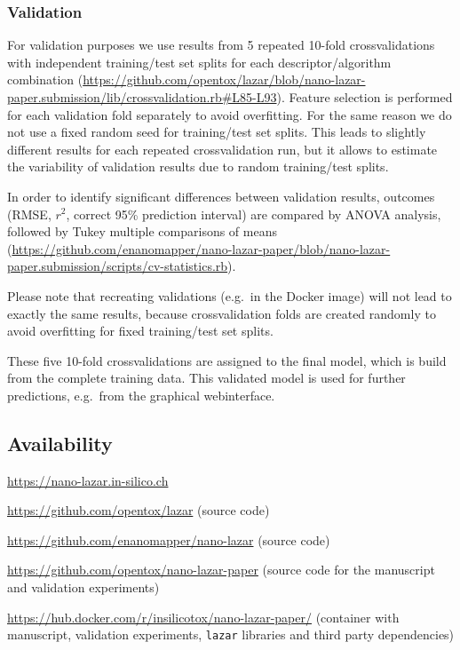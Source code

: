 \documentclass[utf8]{frontiersHLTH} %
\makeatletter
\providecommand{\tightlist}{%
  \setlength{\itemsep}{0pt}\setlength{\parskip}{0pt}}
\newenvironment{description}
	{\list{}{\labelwidth\z@ \itemindent-\leftmargin
		\let\makelabel\descriptionlabel}}
	{\endlist}
\newcommand*\descriptionlabel[1]{\hspace\labelsep
	\normalfont\bfseries #1}
\makeatother
\begin{document}
\subsubsection{Validation}\label{validation}

For validation purposes we use results from 5 repeated 10-fold
crossvalidations with independent training/test set splits for each
descriptor/algorithm combination
(\url{https://github.com/opentox/lazar/blob/nano-lazar-paper.submission/lib/crossvalidation.rb\#L85-L93}).
Feature selection is performed for each validation fold separately to
avoid overfitting. For the same reason we do not use a fixed random seed
for training/test set splits. This leads to slightly different results
for each repeated crossvalidation run, but it allows to estimate the
variability of validation results due to random training/test splits.

In order to identify significant differences between validation results,
outcomes (RMSE, \(r^2\), correct 95\% prediction interval) are compared
by ANOVA analysis, followed by Tukey multiple comparisons of means
(\url{https://github.com/enanomapper/nano-lazar-paper/blob/nano-lazar-paper.submission/scripts/cv-statistics.rb}).

Please note that recreating validations (e.g.~in the Docker image) will
not lead to exactly the same results, because crossvalidation folds are
created randomly to avoid overfitting for fixed training/test set
splits.

These five 10-fold crossvalidations are assigned to the final model,
which is build from the complete training data. This validated model is
used for further predictions, e.g.~from the graphical webinterface.

\subsection{Availability}\label{availability}

\begin{description}
\tightlist
\item[Public webinterface]
\url{https://nano-lazar.in-silico.ch}
\item[\texttt{lazar} framework]
\url{https://github.com/opentox/lazar} (source code)
\item[\texttt{nano-lazar} GUI]
\url{https://github.com/enanomapper/nano-lazar} (source code)
\item[Manuscript]
\url{https://github.com/opentox/nano-lazar-paper} (source code for the
manuscript and validation experiments)
\item[Docker image]
\url{https://hub.docker.com/r/insilicotox/nano-lazar-paper/} (container
with manuscript, validation experiments, \texttt{lazar} libraries and
third party dependencies)
\end{description}
\end{document}
